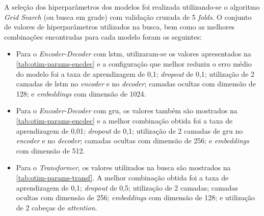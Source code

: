 A seleção dos hiperparâmetros dos modelos foi realizada utilizando-se o algoritmo \textit{Grid Search} (ou busca em grade) com validação cruzada de 5 \textit{folds}. O conjunto de valores de hiperparâmetros utilizados na busca, bem como as melhores combinações encontradas para cada modelo foram os seguintes:




\begin{itemize}
    \item Para o \textit{Encoder-Decoder} com \acrshort{lstm}, utilizaram-se os valores apresentados na \autoref{tab:otim-params-encdec} e a configuração que melhor reduziu o erro médio do modelo foi a taxa de aprendizagem de 0,1; \textit{dropout} de 0,1; utilização de 2 camadas de \acrshort{lstm} no \textit{encoder} e no \textit{decoder}; camadas ocultas com dimensão de 128; e \textit{embeddings} com dimensão de 1024.

    \item Para o \textit{Encoder-Decoder} com \acrshort{gru}, os valores também são mostrados na \autoref{tab:otim-params-encdec} e a melhor combinação obtida foi a taxa de aprendizagem de 0,01; \textit{dropout} de 0,1; utilização de 2 camadas de \acrshort{gru} no \textit{encoder} e no \textit{decoder}; camadas ocultas com dimensão de 256; e \textit{embeddings} com dimensão de 512.

    \item Para o \textit{Transformer}, os valores utilizados na busca são mostrados na \autoref{tab:otim-params-transf}. A melhor combinação obtida foi a taxa de aprendizagem de 0,1; \textit{dropout} de 0,5; utilização de 2 camadas; camadas ocultas com dimensão de 256; \textit{embeddings} com dimensão de 128; e utilização de 2 cabeças de \textit{attention}.
\end{itemize}








